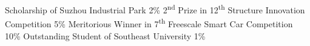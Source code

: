 %
%
%


\begin{scholarship}
					{Scholarship of Suzhou Industrial Park}
                    {2\%}
					{2\textsuperscript{nd} Prize in 12\textsuperscript{th} Structure Innovation Competition}
                    {5\%}
					{Meritorious Winner in 7\textsuperscript{th} Freescale Smart Car Competition}
                    {10\%}
					{Outstanding Student of Southeast University}
                    {1\%}
\end{scholarship}

